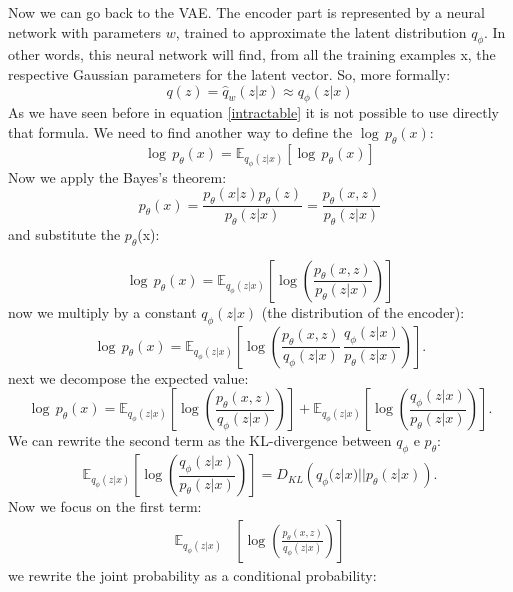 Now we can go back to the VAE.
The encoder part is represented by a neural network with parameters $w$, trained to approximate the latent distribution $q_\phi$.
In other words, this neural network will find, from all the training examples x, the respective Gaussian parameters for the latent vector.
So, more formally:
\begin{equation*}
q(z) =  \hat{q}_w(z|x) \approx q_\phi(z|x) 
\end{equation*}
As we have seen before in equation \ref{intractable} it is not possible to use directly that formula.
We need to find another way to define the $\log \, p_\theta(x)$:
\begin{equation*}
    \log\,{p_\theta (x)} = \mathbb{E}_{q_\phi (z|x)} \left[ \log \, p_\theta (x) \right]
\end{equation*}
Now we apply the Bayes's theorem:
\begin{equation*}
p_\theta(x) = \frac{p_\theta(x|z)p_\theta(z)}{p_\theta(z|x)} = \frac{p_\theta(x,z)}{p_\theta(z|x)}
\end{equation*}
and substitute the $p_\theta$(x):


\begin{equation*}
      \log\,{p_\theta (x)} = \mathbb{E}_{q_\phi (z|x)} \left[ \log \left( \frac{p_\theta(x,z)}{p_\theta(z|x)} \right) \right]
\end{equation*}
now we multiply by a constant $q_\phi (z|x)$ (the distribution of the encoder):
\begin{equation*}
      \log\,{p_\theta (x)} = \mathbb{E}_{q_\phi (z|x)} \left[ \log \left( \frac{p_\theta(x,z)}{q_\phi(z|x)} \, \frac{q_\phi(z|x)}{p_\theta(z|x)} \right) \right].
\end{equation*}
next we decompose the expected value:
\begin{equation*}
\log\,{p_\theta (x)} = \mathbb{E}_{q_\phi (z|x)} \left[ \log \left( \frac{p_\theta(x,z)}{q_\phi(z|x)} \right) \right] + \mathbb{E}_{q_\phi (z|x)} \left[ \log \left( \frac{q_\phi(z|x)}{p_\theta(z|x)} \right) \right].
\end{equation*}
We can rewrite the second term as the KL-divergence between $q_\phi$ e $p_\theta$:
\begin{equation*}
\mathbb{E}_{q_\phi (z|x)} \left[ \log \left( \frac{q_\phi(z|x)}{p_\theta(z|x)} \right) \right] = D_{KL} \left ( q_\phi(z|x)||p_\theta(z|x) \right ).
\end{equation*}
Now we focus on the first term:
\begin{align*}
\mathbb{E}_{q_\phi (z|x)} & \left[ \log \left( \frac{p_\theta(x,z)}{q_\phi(z|x)} \right)\right]
\end{align*}
we rewrite the joint probability as a conditional probability:

